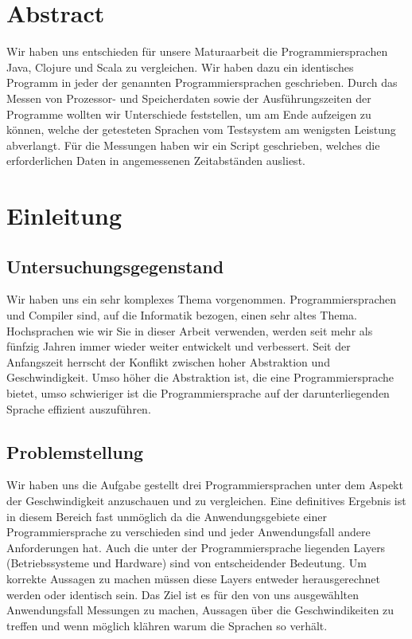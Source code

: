\documentclass{fancydocument}
\begin{document}
\section{Abstract}
Wir haben uns entschieden für unsere Maturaarbeit die Programmiersprachen Java, Clojure und Scala zu vergleichen. Wir haben dazu ein identisches Programm in jeder der genannten Programmiersprachen geschrieben. Durch das Messen von Prozessor- und Speicherdaten sowie der Ausführungszeiten der Programme wollten wir Unterschiede feststellen, um am Ende aufzeigen zu können, welche der getesteten Sprachen vom Testsystem am wenigsten Leistung abverlangt. Für die Messungen haben wir ein Script geschrieben, welches die erforderlichen Daten in angemessenen Zeitabständen ausliest. 

\section{Einleitung}

\subsection{Untersuchungsgegenstand}

Wir haben uns ein sehr komplexes Thema vorgenommen. Programmiersprachen und Compiler sind, auf die Informatik bezogen, einen sehr altes Thema. \\
Hochsprachen wie wir Sie in dieser Arbeit verwenden, werden seit mehr
als fünfzig Jahren immer wieder weiter entwickelt und verbessert. Seit
der Anfangszeit herrscht der Konflikt zwischen hoher Abstraktion und
Geschwindigkeit. Umso höher die Abstraktion ist, die eine
Programmiersprache bietet, umso schwieriger ist die Programmiersprache
auf der darunterliegenden Sprache effizient auszuführen.


\subsection{Problemstellung}

Wir haben uns die Aufgabe gestellt drei Programmiersprachen unter dem
Aspekt der Geschwindigkeit anzuschauen und zu vergleichen. Eine
definitives Ergebnis ist in diesem Bereich fast unmöglich da die
Anwendungsgebiete einer Programmiersprache zu verschieden sind und
jeder Anwendungsfall andere Anforderungen hat. Auch die
unter der Programmiersprache liegenden Layers (Betriebssysteme und
Hardware) sind von entscheidender Bedeutung. Um korrekte Aussagen zu
machen m\"ussen diese Layers entweder herausgerechnet werden oder
identisch sein. Das Ziel ist es f\"ur den von uns ausgew\"ahlten Anwendungsfall Messungen
zu machen, Aussagen \"uber die Geschwindikeiten zu treffen und
wenn m\"oglich kl\"ahren warum die Sprachen so verh\"alt.
\end{document}
